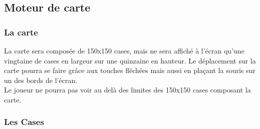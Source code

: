 \documentclass[a4paper]{memoir}
\begin{document}
				
			\subsection{Moteur de carte}
		
				\subsubsection{La carte}

					La carte sera composée de 150x150 cases, mais ne sera affiché à l'écran qu'une vingtaine de cases en largeur sur une quinzaine en hauteur. Le déplacement sur la carte pourra se faire grâce aux touches fléchées mais aussi en plaçant la souris sur un des bords de l'écran.\\
					Le joueur ne pourra pas voir au delà des limites des 150x150 cases composant la carte.

				\subsubsection{Les Cases}
\end{document}
